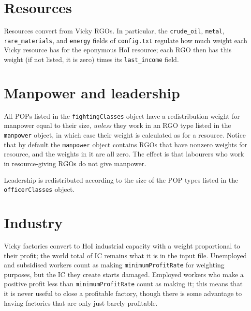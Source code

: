 \documentclass[12pt,ebook,oneside]{book}
\begin{document}
\section{Resources}

Resources convert from Vicky RGOs. In particular, the
\texttt{crude\_oil}, \texttt{metal}, \texttt{rare\_materials}, and
\texttt{energy} fields of \texttt{config.txt} regulate how much weight
each Vicky resource has for the eponymous HoI resource; each RGO then
has this weight (if not listed, it is zero) times its
\texttt{last\_income} field. 

\section{Manpower and leadership}

All POPs listed in the \texttt{fightingClasses} object have a
redistribution weight for manpower equal to their size, \emph{unless}
they work in an RGO type listed in the \texttt{manpower} object, in
which case their weight is calculated as for a resource. Notice that
by default the \texttt{manpower} object contains RGOs that have
nonzero weights for resource, and the weights in it are all zero. The
effect is that labourers who work in resource-giving RGOs do not give
manpower. 

Leadership is redistributed according to the size of the POP types
listed in the \texttt{officerClasses} object. 

\section{Industry} 

Vicky factories convert to HoI industrial capacity with a weight
proportional to their profit; the world total of IC remains what it
is in the input file. Unemployed and subsidised workers count as
making \texttt{minimumProfitRate} for weighting purposes, but the IC
they create starts damaged. Employed workers who make a positive
profit less than \texttt{minimumProfitRate} count as making it; this
means that it is never useful to close a profitable factory, though
there is some advantage to having factories that are only just barely
profitable. 
\end{document}
